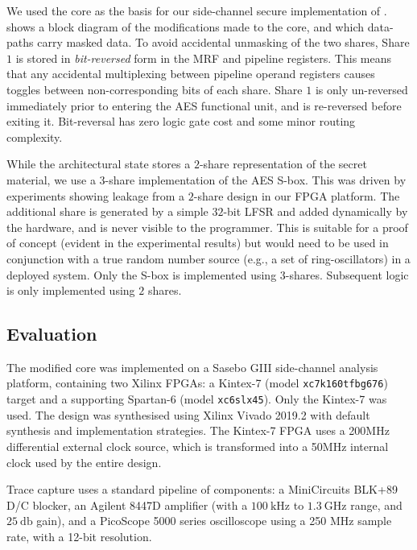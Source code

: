 We used the  core as the basis for our side-channel secure
implementation of .
 shows a block diagram of the modifications
made to the core, and which data-paths carry masked data.
To avoid accidental unmasking of the two shares,
Share $1$ is stored in {\em bit-reversed} form in the MRF and pipeline
registers.
This means that any accidental multiplexing between pipeline operand
registers causes toggles between non-corresponding bits of each share.
Share $1$ is only un-reversed immediately prior to entering the
AES functional unit, and is re-reversed before exiting it.
Bit-reversal has zero logic gate cost and some minor routing complexity.

While the architectural state stores a $2$-share representation
of the secret material, we use a $3$-share implementation of the
AES S-box.
This was driven by experiments showing 
leakage from a $2$-share design in our FPGA platform.
The additional share is generated by a simple $32$-bit LFSR and added
dynamically by the hardware, and is never visible to the programmer.
This is suitable for a proof of concept (evident in the experimental
results) but would need to be used in conjunction with a true random
number source (e.g., a set of ring-oscillators) in a deployed system.
Only the S-box is implemented using $3$-shares.
Subsequent  logic is only implemented using $2$ shares.

\subsection{Evaluation}

The modified  core was implemented on a
Sasebo GIII \cite{HKSS:12}
side-channel analysis platform, containing two Xilinx FPGAs:
a Kintex-7 
(model {\tt xc7k160tfbg676})
target
and
a supporting Spartan-6
(model {\tt xc6slx45}).
Only the Kintex-7 was used.
The design was synthesised using Xilinx Vivado 2019.2 with
default synthesis and implementation strategies.
The Kintex-7 FPGA uses a 200MHz differential external clock source, which is
transformed into a 50MHz internal clock used by the entire design.

Trace capture uses a standard pipeline of components:
a MiniCircuits BLK+89 D/C blocker,
an Agilent 8447D amplifier (with a $\SI{100}{\kilo\hertz}$ to $\SI{1.3}{\giga\hertz}$ range, and $\SI{25}{\decibel}$ gain),
and
a  PicoScope 5000 series oscilloscope using a
250 MHz sample rate, with a 12-bit resolution.

